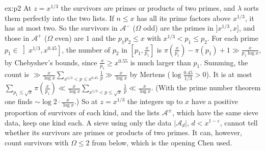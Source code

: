 \begin{solution}{ex:p2}
\idea At $z=x^{1/3}$ the survivors are primes or products of two primes, and $\lambda$ sorts them perfectly into the two lists.
\writeup If $n\le x$ has all its prime factors above $x^{1/3}$, it has at most two. So the survivors in $\mathcal A^-$ ($\Omega$ odd) are the primes in $]x^{1/3},x]$, and those in $\mathcal A^+$ ($\Omega$ even) are $1$ and the $p_1p_2\le x$ with $x^{1/3}<p_1\le p_2$.
For each prime $p_1\in\left]x^{1/3},x^{0.45}\right]$, the number of $p_2$ in $[p_1,\frac x{p_1}]$ is $\pi(\frac x{p_1})-\pi(p_1)+1\gg\frac x{p_1\log x}$, by Chebyshev's bounds, since $\frac x{p_1}\ge x^{0.55}$ is much larger than $p_1$. Summing, the count is $\gg\frac x{\log x}\sum_{x^{1/3}<p\le x^{0.45}}\frac1p\gg\frac x{\log x}$ by Mertens ($\log\frac{0.45}{1/3}>0$). It is at most $\sum_{p_1\le\sqrt x}\pi(\frac x{p_1})\ll\frac x{\log x}\sum_{x^{1/3}<p\le\sqrt x}\frac1p\ll\frac x{\log x}$. (With the prime number theorem one finds $\sim\log2\cdot\frac x{\log x}$.)
So at $z=x^{1/3}$ the integers up to $x$ have a positive proportion of survivors of each kind, and the lists $\mathcal A^\pm$, which have the same sieve data, keep one kind each. A sieve using only the data $|\mathcal A_d|$, $d<x^{1-\varepsilon}$, cannot tell whether its survivors are primes or products of two primes. It can, however, count survivors with $\Omega\le2$ from below, which is the opening Chen used.
\end{solution}

